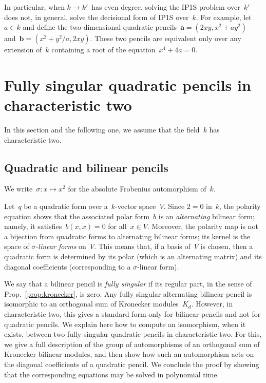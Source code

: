\documentclass{article}%
\begin{document}
In particular, when $k → k'$~has even degree,
solving the IP1S problem over~$k'$
does not, in general, solve the decisional form of IP1S over~$k$.
For example, let~$a ∈ k$ and define the two-dimensional
quadratic pencils~$\bm{a} = (2 x y, x^2 + a y^2)$
and~$\bm{b} = (x^2 + y^2/a, 2 x y)$.
These two pencils are equivalent only over any extension of~$k$
containing a root of the equation~$x^4 + 4 a = 0$.


\section{Fully singular quadratic pencils in characteristic two}%
\label{S:quad-sing}
In this section and the following one, we assume that the field~$k$ has
characteristic two.

\subsection{Quadratic and bilinear pencils}%

We write~$σ: x ↦ x^2$ for the absolute Frobenius automorphism of~$k$.

Let~$q$ be a quadratic form over a~$k$-vector space~$V$. Since $2 = 0$
in~$k$, the polarity equation shows that the associated polar form~$b$ is
an \emph{alternating} bilinear form; namely, it satisfies~$b(x,x) = 0$
for all~$x ∈ V$. Moreover, the polarity map is not a bijection from
quadratic forms to alternating bilinear forms; its kernel is the space of
\emph{$σ$-linear forms} on~$V$. This means that, if a basis of~$V$ is
chosen, then a quadratic form is determined by its polar (which is an
alternating matrix) and its diagonal coefficients (corresponding to a
$σ$-linear form).

\bigbreak

We say that a bilinear pencil is \emph{fully singular} if
its regular part, in the sense of Prop.~\ref{prop:kronecker}, is zero.
Any fully singular alternating bilinear pencil is isomorphic to
an orthogonal sum of Kronecker modules~$K_d$.
However, in characteristic two, this gives a standard form only for
bilinear pencils and not for quadratic pencils. We explain here how to
compute an isomorphism, when it exists, between two fully singular
quadratic pencils in characteristic two. For this, we give a full
description of the group of automorphisms of an orthogonal sum of
Kronecker bilinear modules, and then show how such an automorphism acts
on the diagonal coefficients of a quadratic pencil.
We conclude the proof by showing that the corresponding equations
may be solved in polynomial time.
\end{document}
